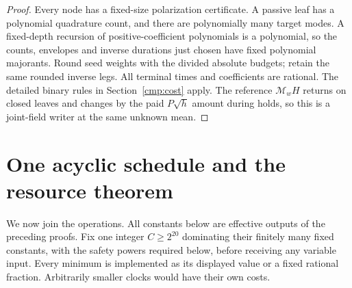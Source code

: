 \documentclass[11pt,a4paper]{amsart}
\theoremstyle{definition}
\theoremstyle{remark}
\numberwithin{equation}{section}
\begin{document}
\begin{proof}
Every node has a fixed-size polarization certificate. A passive leaf has a polynomial quadrature count, and there are polynomially many target modes. A fixed-depth recursion of positive-coefficient polynomials is a polynomial, so the counts, envelopes and inverse durations just chosen have fixed polynomial majorants. Round seed weights with the divided absolute budgets; retain the same rounded inverse legs. All terminal times and coefficients are rational. The detailed binary rules in Section~\ref{cmp:cost} apply. The reference $\mathcal M_wH$ returns on closed leaves and changes by the paid $P\sqrt h$ amount during holds, so this is a joint-field writer at the same unknown mean.
\end{proof}



\section{One acyclic schedule and the resource theorem}\label{sec:schedule}
We now join the operations. All constants below are effective outputs of the preceding proofs. Fix one integer $C\ge2^{20}$ dominating their finitely many fixed constants, with the safety powers required below, before receiving any variable input. Every minimum is implemented as its displayed value or a fixed rational fraction. Arbitrarily smaller clocks would have their own costs.
\end{document}
